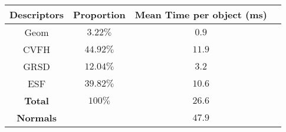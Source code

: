 \documentclass[a4paper, 10pt, journal]{article}
\begin{document}
\begin{center}
  \centering
  \begin{tabular}{cccc}
  \toprule
     \textbf{Descriptors} & \textbf{Proportion} & \textbf{Mean Time per object (ms)} \\
  \midrule  
   Geom		    	& $3.22\%$	& $0.9$  \\
  \midrule  
   CVFH				& $44.92\%$	& $11.9$ \\
  \midrule  
   GRSD				& $12.04\%$	& $3.2$  \\
  \midrule  
   ESF				& $39.82\%$	& $10.6$ \\
  \midrule  
   \textbf{Total}	& $100\%$	& $26.6$ \\
  \midrule \midrule
   \textbf{Normals}  & & $47.9$\\
  \bottomrule 
 \end{tabular}
\end{center}
\end{document}
